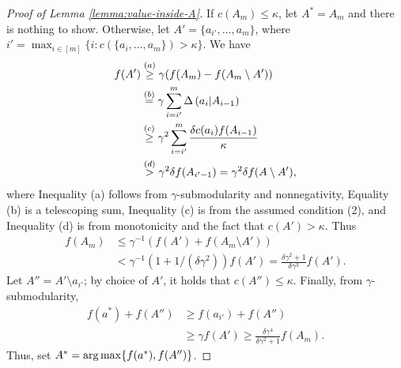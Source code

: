 \begin{proof}[Proof of Lemma \ref{lemma:value-inside-A}]
  If $c(A_m) \le \kappa$, let $A^* = A_m$ and there is nothing to show.
  Otherwise, let $A' =  \{a_{i'}, \ldots, a_m \}$, where $i' = \max_{i \in [m]} \{ i: c( \{ a_i, \ldots, a_m \} ) > \kappa \}$.
  We have
  \begin{align*}
    f(A') &\overset{(a)}{\ge} \gamma ( f(A_m) - f( A_m \setminus A') ) \\
          &\overset{(b)}{=} \gamma \sum_{i=i'}^m \Delta \left(  a_i  |  A_{i-1}  \right) \\
          &\overset{(c)}{\ge} \gamma^2 \sum_{i=i'}^m \frac{ \delta c(a_i) f( A_{i-1} )}{\kappa} \\
          &\overset{(d)}{>} \gamma^2 \delta f(A_{i'-1} ) = \gamma^2 \delta f( A \setminus A' ),
  \end{align*}
  where Inequality (a) follows from $\gamma$-submodularity and nonnegativity, Equality (b)
  is a telescoping sum, Inequality (c) is from the assumed condition (2), and Inequality
  (d) is from monotonicity and the fact that $c( A' ) > \kappa$.
  Thus
  \begin{align*}
    f(A_m) &\le \gamma^{-1} (f(A') + f( A_m \setminus A')) \\
           &< \gamma^{-1}(1 + 1/(\delta \gamma^2 )) f(A') = \frac{\delta \gamma^2  +1}{\delta \gamma^3 } f(A').
  \end{align*}
  Let $A'' = A' \setminus a_{i'}$; by choice of $A'$, it holds that $c(A'') \le \kappa$.
  Finally, from $\gamma$-submodularity,
  \begin{align*}
    f(a^*) + f(A'') &\ge f(a_{i'}) + f(A'') \\
                    &\ge \gamma f(A') \ge \frac{\delta \gamma^4}{\delta \gamma^2 + 1} f(A_m).
  \end{align*}
  Thus, set $A^* = \operatorname*{arg\,max} \{ f( a^* ), f(A'') \}$. 
\end{proof}

